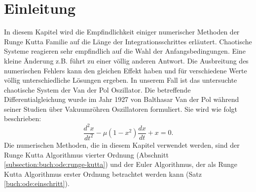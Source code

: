 %
%
%
\section{Einleitung\label{vanderpol:section:einleitung}}
In diesem Kapitel wird die Empfindlichkeit einiger numerischer Methoden der Runge Kutta Familie auf die Länge der Integrationsschrittes erläutert.
Chaotische Systeme reagieren sehr empfindlich auf die Wahl der Anfangsbedingungen. Eine kleine Änderung z.B. führt zu einer völlig anderen Antwort.
Die Ausbreitung des numerischen Fehlers kann den gleichen Effekt haben und für verschiedene Werte völlig unterschiedliche Lösungen ergeben.
In unserem Fall ist das untersuchte chaotische System der Van der Pol Oszillator.
Die betreffende Differentialgleichung wurde im Jahr 1927 von Balthasar Van der Pol während seiner Studien über Vakuumröhren Oszillatoren formuliert.
Sie wird wie folgt beschrieben:
\begin{equation}
\frac{d^{2}x}{dt^{2}} - \mu (1 - x^{2}) \frac{dx}{dt} + x = 0.
\label{vanderpol:equations:vdp}
\end{equation}
Die numerischen Methoden, die in diesem Kapitel verwendet werden, sind der Runge Kutta Algorithmus vierter Ordnung (Abschnitt \ref{subsection:buch:ode:runge-kutta}) und der Euler Algorithmus, der als Runge Kutta Algorithmus erster Ordnung betrachtet werden kann (Satz \ref{buch:ode:einschritt}).
